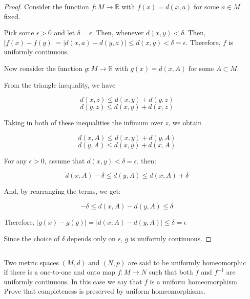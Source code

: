 \begin{proof}
Consider the function $f: M \rightarrow \mathbb{R}$ with $f(x) = d(x,a)$ for some $a \in M$ fixed.

Pick some $\epsilon > 0$ and let $\delta = \epsilon$. Then, whenever $d(x,y) < \delta$. Then, $|f(x) - f(y)| = |d(x, a) - d(y,a)| \leq d(x,y) < \delta = \epsilon$. Therefore, $f$ is uniformly continuous.

\vspace{1em}

Now consider the function $g: M \rightarrow \mathbb{R}$ with $g(x) = d(x,A)$ for some $A \subset M$.

From the triangle inequality, we have
\vspace{-3em}
\begin{multicols}{2}
  \begin{equation*}
    d(x,z) \leq d(x,y) + d(y,z)
  \end{equation*}\break
  \begin{equation*}
    d(y,z) \leq d(x,y) + d(x,z)
  \end{equation*}
\end{multicols}

Taking in both of these inequalities the infimum over $z$, we obtain
\vspace{-3em}
\begin{multicols}{2}
  \begin{equation*}
    d(x,A) \leq d(x,y) + d(y,A)
  \end{equation*}\break
  \begin{equation*}
    d(y,A) \leq d(x,y) + d(x,A)
  \end{equation*}
\end{multicols}


For any $\epsilon > 0$, assume that $d(x,y) < \delta = \epsilon$, then:

$$ d(x,A) - \delta \leq d(y,A) \leq d(x,A) + \delta$$

And, by rearranging the terms, we get:

$$ -\delta \leq d(x,A) - d(y,A) \leq \delta$$

Therefore, $|g(x) - g(y)| = |d(x,A) - d(y,A)| \leq \delta = \epsilon$

Since the choice of $\delta$ depends only on $\epsilon$, $g$ is uniformly continuous.
\end{proof}

\subsection{} Two metric spaces $(M, d)$ and $(N, p)$ are said to be uniformly homeomorphic if there is a one-to-one and onto map $f: M \rightarrow N$ such that both $f$ and $f^{-1}$ are uniformly continuous. In this case we say that $f$ is a uniform homeomorphism. Prove that completeness is preserved by uniform homeomorphisms. 

